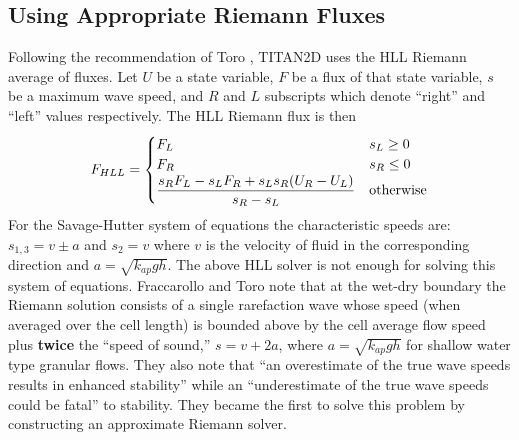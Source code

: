 \documentclass[letterpaper,10pt]{article}
\begin{document}
\subsection{Using Appropriate Riemann Fluxes} \label{Riemann}
Following the recommendation of Toro \cite{ToroBook2001}, TITAN2D uses 
the HLL Riemann average of fluxes. Let $U$ be a state variable, $F$ 
be a flux of that state variable, $s$ be a maximum wave speed, 
and $R$ and $L$ subscripts which denote ``right'' and ``left'' values 
respectively. The HLL Riemann flux is then
\begin{equation}
        F_{HLL}=\begin{cases}
                F_L & s_L\ge 0\\
                F_R & s_R\le 0\\
                \dfrac{s_RF_L-s_LF_R+s_Ls_R(U_R-U_L)}{s_R-s_L} & \textnormal{otherwise}
        \end{cases}
\end{equation}
For the Savage-Hutter system of equations the characteristic speeds are: $s_{1,3}=v\pm a$ and $s_2=v$ where $v$ is the 
velocity of fluid in the corresponding direction and $a=\sqrt{k_{ap}gh}$.
The above HLL solver is not enough for solving this system of equations.
Fraccarollo and Toro \cite{FraccarolloToro1995} note that at the 
wet-dry boundary the Riemann solution consists of a single rarefaction 
wave whose speed (when averaged over the cell length) 
is bounded above by the cell average flow speed plus 
{\bf twice} the ``speed of sound,'' $s=v+2a$, where $a=\sqrt{k_{ap}gh}$ 
for shallow water type granular flows.  They also note that ``an overestimate 
of the true wave speeds results in enhanced stability'' while an 
``underestimate of the true wave speeds could be fatal'' to stability.
They became the first to 
solve this problem by constructing an approximate Riemann solver.
\end{document}
